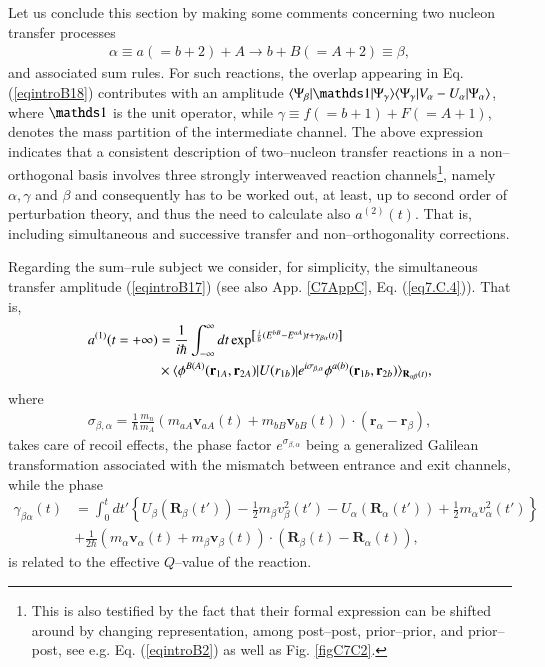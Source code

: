 \begin{subappendices}
 Let us conclude this section by making some comments concerning two nucleon transfer processes
 \begin{align}
 \alpha\equiv a (=b+2)+A\rightarrow b+B(=A+2)\equiv\beta,
 \end{align}
 and associated sum rules.
 For such reactions, the overlap appearing in Eq. (\ref{eqintroB18}) 
 contributes with an amplitude $\braket{\Psi_\beta|\idop|\Psi_\gamma}\braket{\Psi_\gamma|V_\alpha-U_\alpha|\Psi_\alpha}$, where $\idop$ is the unit operator, while $\gamma\equiv f(=b+1)+F(=A+1)$, denotes the mass partition of the intermediate channel. 
 The above expression indicates that a consistent description of two--nucleon transfer reactions in a non--orthogonal basis involves  three strongly interweaved  reaction channels\footnote{This is also testified by the fact that their formal expression can be shifted around by changing representation, among  post--post, prior--prior, and prior--post, see e.g. Eq. (\ref{eqintroB2}) as well as Fig. \ref{figC7C2}.}, namely $\alpha,\gamma$ and $\beta$ and consequently has to be worked out, at least, up to second order of perturbation theory, and thus the need to calculate also $a^{(2)}(t)$. That is, including simultaneous and successive transfer and non--orthogonality corrections.
 
 Regarding the sum--rule subject we consider,  for simplicity, the simultaneous transfer amplitude (\ref{eqintroB17}) (see also App. \ref{C7AppC}, Eq. (\ref{eq7.C.4})). That is,
 \begin{align}\label{eqintroB19}
 \nonumber a^{(1)}(t=+\infty)&=\frac{1}{i\hbar}\int^{\infty}_{-\infty}dt\exp^{\left[\frac{i}{\hbar}(E^{bB}-E^{aA})t+\gamma_{\beta\alpha}(t)\right]}\\
 &\times\langle {\phi^{B(A)}(\mathbf r_{1A},\mathbf r_{2A})|U(r_{1b})|e^{i\sigma_{\beta,\alpha}}\phi^{a(b)}(\mathbf r_{1b},\mathbf r_{2b})} \rangle_{\mathbf R_{\alpha\beta}(t)},
 \end{align}
 where
 \begin{align}
 \sigma_{\beta,\alpha}=\frac{1}{\hbar}\frac{m_n}{m_A}(m_{aA}\mathbf v_{aA}(t)+m_{bB}\mathbf v_{bB}(t))\cdot(\mathbf r_\alpha-\mathbf r_\beta),
 \end{align}
 takes care of recoil effects, the phase factor $e^{\sigma_{\beta,\alpha}}$ being a generalized Galilean transformation associated with the mismatch between entrance and exit channels,  while the phase
 \begin{align}\label{eqintroB21}
 \nonumber\gamma_{\beta\alpha}(t)&=\int^t_0 dt'\left\{U_\beta(\mathbf R_{\beta}(t'))-\frac{1}{2}m_\beta v_\beta^2(t')-U_\alpha(\mathbf R_\alpha(t'))+\frac{1}{2}m_\alpha v_\alpha^2(t')\right\}\\
 &+\frac{1}{2\hbar}\left(m_\alpha \mathbf v_\alpha(t)+m_\beta \mathbf v_\beta(t) \right)\cdot(\mathbf R_\beta(t)-\mathbf R_\alpha(t)),
 \end{align}
 is related to the effective $Q$--value of the reaction.
 

\end{subappendices}
